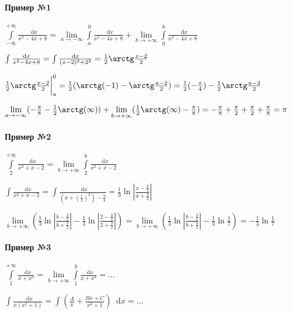 \documentclass{article}
\newcommand*\diff{\mathop{}\!\mathrm{d}}
\begin{document}
\paragraph{Пример №1}

$\int\limits_{-\infty}^{+\infty} \frac{\diff x}{x^2 - 4x + 8} = \lim\limits_{a \to -\infty} \int\limits_{a}^{0} \frac{\diff x}{x^2 - 4x + 8} + \lim\limits_{b \to +\infty} \int\limits_{0}^{b} \frac{\diff x}{x^2 - 4x + 8}$

$\int \frac{\diff x}{x^2 - 4x + 8} = \int \frac{\diff x}{(x - 2)^2 + 2^2} = \frac{1}{2} \arctg \frac{x - 2}{2}$

$\frac{1}{2} \arctg \frac{x - 2}{2} \bigg|_{a}^{0} = \frac{1}{2} (\arctg (-1) - \arctg \frac{a - 2}{2}) = \frac{1}{2} (-\frac{\pi}{4}) - \frac{1}{2} \arctg \frac{a - 2}{2}$

$\lim\limits_{a \to -\infty} (-\frac{\pi}{8} - \frac{1}{2} \arctg (\infty)) + \lim\limits_{b \to +\infty} (\frac{1}{2} \arctg (\infty) - \frac{\pi}{8}) = -\frac{\pi}{8} + \frac{\pi}{2} + \frac{\pi}{2} + \frac{\pi}{8} = \pi$

\paragraph{Пример №2}

$\int\limits_{2}^{+\infty} \frac{\diff x}{x^2 + x - 2} = \lim\limits_{b \to +\infty} \int\limits_{2}^{b} \frac{\diff x}{x^2 + x - 2}$

$\int \frac{\diff x}{x^2 + x - 2} = \int \frac{\diff x}{(x + (\frac{1}{2})^2) - \frac{9}{4}} = \frac{1}{3} \ln | \frac{x - \frac{3}{2}}{x + \frac{3}{2}} |$

$
\lim\limits_{b \to +\infty} (\frac{1}{3} \ln | \frac{b - \frac{3}{2}}{b + \frac{3}{2}} | - \frac{1}{3} \ln | \frac{2 - \frac{3}{2}}{2 + \frac{3}{2}} |) = \lim\limits_{b \to +\infty} (\frac{1}{3} \ln | \frac{b - \frac{3}{2}}{b + \frac{3}{2}} | - \frac{1}{3} \ln \frac{1}{7}) = - \frac{1}{3} \ln \frac{1}{7}
$

\paragraph{Пример №3}

$\int\limits_{1}^{+\infty} \frac{\diff x}{x + x^3} = \lim\limits_{b \to +\infty} \int\limits_{1}^{b} \frac{\diff x}{x + x^3} = \dots$

$\int \frac{\diff x}{x (x^2 + 1)} = \int (\frac{A}{x} + \frac{B x + C}{x^2 + 1}) \diff x = \dots$
\end{document}
